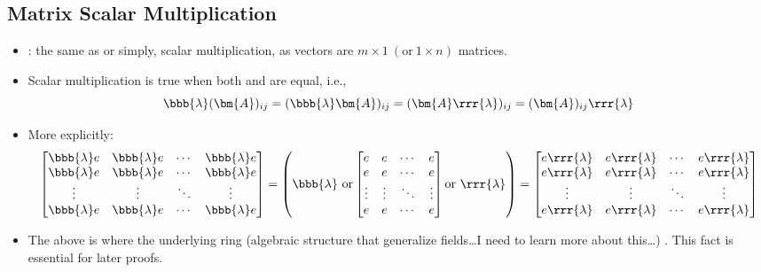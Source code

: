 \begin{itemize}
  \subsection{Matrix Scalar Multiplication}\label{Matrix Scalar Multiplication}
  \begin{itemize}
    \item {}: the same as \hyperref[Vector Scalar Multiplication]{} or simply, scalar multiplication, as vectors are \(m \times 1~(\text{or}~1 \times n)\) matrices.
    \item Scalar multiplication is true when both  and  are equal, i.e.,
    \[%
    \bbb{\lambda}(\bm{A})_{ij} = (\bbb{\lambda} \bm{A})_{ij} = ( \bm{A}\rrr{\lambda})_{ij}= (\bm{A})_{ij}\rrr{\lambda} %
    \]%
    \item More explicitly: 
    \[%
    \begin{bmatrix}
    \bbb{\lambda} e & \bbb{\lambda} e & \cdots & \bbb{\lambda} e \\
    \bbb{\lambda} e & \bbb{\lambda} e & \cdots & \bbb{\lambda} e \\
    \vdots & \vdots & \ddots & \vdots \\
    \bbb{\lambda} e & \bbb{\lambda} e & \cdots & \bbb{\lambda} e
    \end{bmatrix}
    =
    \left(
      \bbb{\lambda}~\text{or}
    \begin{bmatrix}
    e & e & \cdots & e \\
    e & e & \cdots & e \\
    \vdots & \vdots & \ddots & \vdots \\
    e & e & \cdots & e
    \end{bmatrix}
      \text{or}~\rrr{\lambda}
    \right)
    =
    \begin{bmatrix}
    e\rrr{\lambda} & e\rrr{\lambda} & \cdots & e\rrr{\lambda} \\
    e\rrr{\lambda} & e\rrr{\lambda} & \cdots & e\rrr{\lambda} \\
    \vdots & \vdots & \ddots & \vdots \\
    e\rrr{\lambda} & e\rrr{\lambda} & \cdots & e\rrr{\lambda}
    \end{bmatrix}
    \]%
    \item The above is  where the underlying ring (algebraic structure that generalize fields\dots I need to learn more about this\dots) . This fact is essential for later proofs.
  \end{itemize}
  

\end{itemize}
